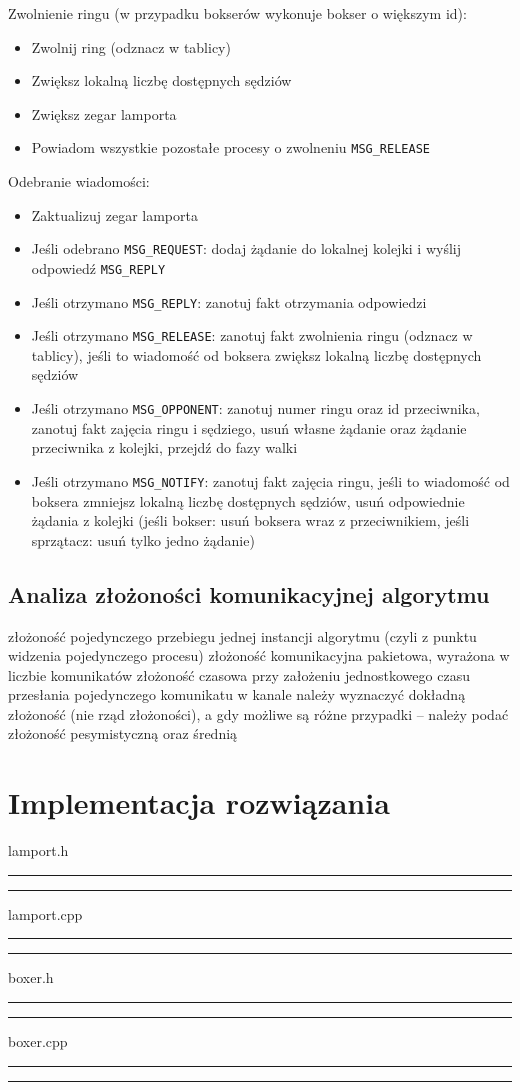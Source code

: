 \documentclass{article}
\begin{document}
Zwolnienie ringu (w przypadku bokserów wykonuje bokser o większym id):
\begin{itemize}
    \item Zwolnij ring (odznacz w tablicy)
    \item Zwiększ lokalną liczbę dostępnych sędziów
    \item Zwiększ zegar lamporta
    \item Powiadom wszystkie pozostałe procesy o zwolneniu \verb|MSG_RELEASE|
\end{itemize}

Odebranie wiadomości:
\begin{itemize}
    \item Zaktualizuj zegar lamporta
    \item Jeśli odebrano \verb|MSG_REQUEST|: dodaj żądanie do lokalnej
    kolejki i  wyślij odpowiedź \verb|MSG_REPLY|
    \item Jeśli otrzymano \verb|MSG_REPLY|: zanotuj fakt otrzymania
    odpowiedzi
    \item Jeśli otrzymano \verb|MSG_RELEASE|: zanotuj fakt zwolnienia
    ringu (odznacz w tablicy), jeśli to wiadomość od boksera zwiększ
    lokalną liczbę dostępnych sędziów
    \item Jeśli otrzymano \verb|MSG_OPPONENT|: zanotuj numer ringu oraz
    id przeciwnika, zanotuj fakt zajęcia ringu i sędziego, usuń własne
    żądanie oraz żądanie przeciwnika z kolejki, przejdź do fazy walki
    \item Jeśli otrzymano \verb|MSG_NOTIFY|: zanotuj fakt zajęcia ringu,
    jeśli to wiadomość od boksera zmniejsz lokalną liczbę dostępnych
    sędziów, usuń odpowiednie żądania z kolejki (jeśli bokser: usuń
    boksera wraz z przeciwnikiem, jeśli sprzątacz: usuń tylko jedno
    żądanie)
\end{itemize}


\subsection{Analiza złożoności komunikacyjnej algorytmu}
złożoność pojedynczego przebiegu jednej instancji algorytmu (czyli z punktu widzenia pojedynczego procesu) 
złożoność komunikacyjna pakietowa, wyrażona w liczbie komunikatów
złożoność czasowa przy założeniu jednostkowego czasu przesłania pojedynczego komunikatu w kanale
należy wyznaczyć dokładną złożoność (nie rząd złożoności), a gdy możliwe są różne przypadki – należy podać złożoność pesymistyczną oraz średnią

\section{Implementacja rozwiązania}
lamport.h
\hrule

\hrule
lamport.cpp
\hrule

\hrule
boxer.h
\hrule

\hrule
boxer.cpp
\hrule

\hrule
\end{document}
